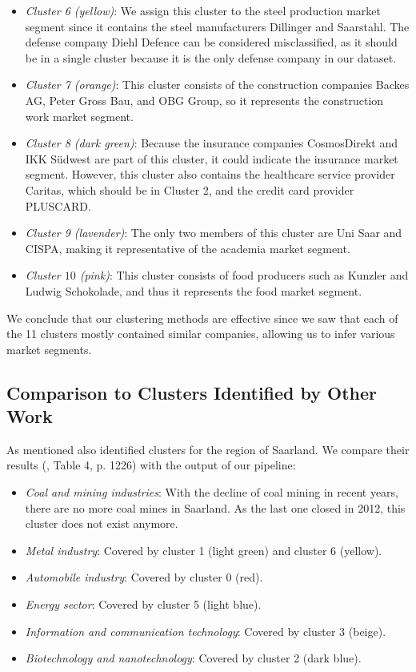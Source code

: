 \documentclass[conference]{IEEEtran}
\begin{document}
\begin{itemize}
	\item \textit{Cluster 6 (yellow)}: We assign this cluster to the steel production market segment since it contains the steel manufacturers Dillinger and Saarstahl. The defense company Diehl Defence can be considered misclassified, as it should be in a single cluster because it is the only defense company in our dataset.
	
	\item \textit{Cluster 7 (orange)}: This cluster consists of the construction companies Backes AG, Peter Gross Bau, and OBG Group, so it represents the construction work market segment.
	
	\item \textit{Cluster 8 (dark green)}: Because the insurance companies CosmosDirekt and IKK Südwest are part of this cluster, it could indicate the insurance market segment. However, this cluster also contains the healthcare service provider Caritas, which should be in Cluster 2, and the credit card provider PLUSCARD.
	
	\item \textit{Cluster 9 (lavender)}: The only two members of this cluster are Uni Saar and CISPA, making it representative of the academia market segment.
	
	\item \textit{Cluster $10$ (pink)}: This cluster consists of food producers such as Kunzler and Ludwig Schokolade, and thus it represents the food market segment.
\end{itemize}
We conclude that our clustering methods are effective since we saw that each of the 11 clusters mostly contained similar companies, allowing us to infer various market segments.

\subsection{Comparison to Clusters Identified by Other Work}

As mentioned \cite{saarlandeco2} also identified clusters for the region of Saarland. We compare their results (\cite{saarlandeco2}, Table 4, p. 1226) with the output of our pipeline:


\begin{itemize}
	\item \textit{Coal and mining industries}: With the decline of coal mining in recent years, there are no more coal mines in Saarland. As the last one closed in 2012, this cluster does not exist anymore. 
	\item \textit{Metal industry}: Covered by cluster 1 (light green) and cluster 6 (yellow).
	\item \textit{Automobile industry}: Covered by cluster 0 (red).
	\item \textit{Energy sector}: Covered by cluster 5 (light blue).
	\item \textit{Information and communication technology}: Covered by cluster 3 (beige).
	\item \textit{Biotechnology and nanotechnology}: Covered by cluster 2 (dark blue).
\end{itemize}
\end{document}
